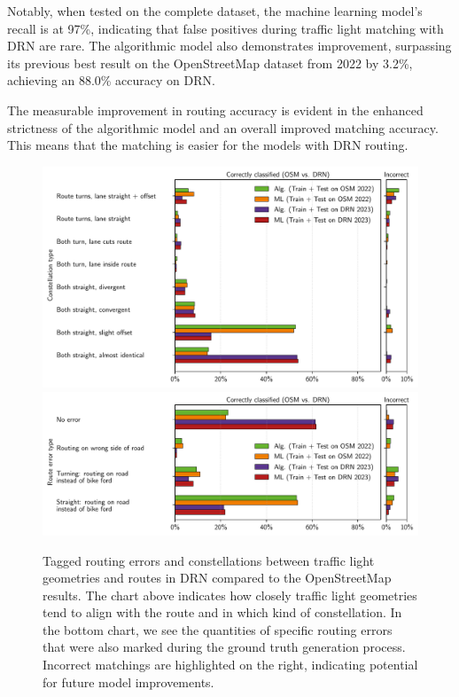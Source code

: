 Notably, when tested on the complete dataset, the machine learning model's recall is at 97\%, indicating that false positives during traffic light matching with DRN are rare. The algorithmic model also demonstrates improvement, surpassing its previous best result on the OpenStreetMap dataset from 2022 by 3.2\%, achieving an 88.0\% accuracy on DRN. 

The measurable improvement in routing accuracy is evident in the enhanced strictness of the algorithmic model and an overall improved matching accuracy. This means that the matching is easier for the models with DRN routing.

\begin{figure}[!t]
\centering 
\includegraphics[width=\linewidth]{images/matching-constellations-osm-vs-drn.pdf} \\
\includegraphics[width=\linewidth]{images/matching-route-errors-osm-vs-drn.pdf}
\caption{Tagged routing errors and constellations between traffic light geometries and routes in DRN compared to the OpenStreetMap results. The chart above indicates how closely traffic light geometries tend to align with the route and in which kind of constellation. In the bottom chart, we see the quantities of specific routing errors that were also marked during the ground truth generation process. Incorrect matchings are highlighted on the right, indicating potential for future model improvements.}
\label{fig:matching-constellations-osm-vs-drn}
\end{figure}

